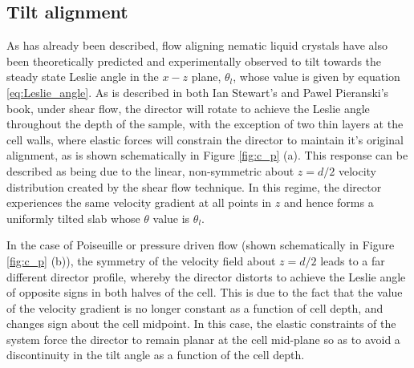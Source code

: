 \subsection{Tilt alignment}
\label{sec:tilt_alignment}
As has already been described, flow aligning nematic liquid crystals have also been theoretically predicted and experimentally observed to tilt towards the steady state Leslie angle in the $x-z$ plane, $\theta_l$, whose value is given by equation \ref{eq:Leslie_angle}. As is described in both Ian Stewart's \cite{Stewart2004} and Pawel Pieranski's \cite{Pieranski2005} book, under shear flow, the director will rotate to achieve the Leslie angle throughout the depth of the sample, with the exception of two thin layers at the cell walls, where elastic forces will constrain the director to maintain it's original alignment, as is shown schematically in Figure \ref{fig:c_p} (a). This response can be described as being due to the linear, non-symmetric about $z=d/2$ velocity distribution created by the shear flow technique. In this regime, the director experiences the same velocity gradient at all points in $z$ and hence forms a uniformly tilted slab whose $\theta$ value is $\theta_l$.

In the case of Poiseuille or pressure driven flow (shown schematically in Figure \ref{fig:c_p} (b)), the symmetry of the velocity field about $z=d/2$ leads to a far different director profile, whereby the director distorts to achieve the Leslie angle of opposite signs in both halves of the cell. This is due to the fact that the value of the velocity gradient is no longer constant as a function of cell depth, and changes sign about the cell midpoint. In this case, the elastic constraints of the system force the director to remain planar at the cell mid-plane so as to avoid a discontinuity in the tilt angle as a function of the cell depth.

